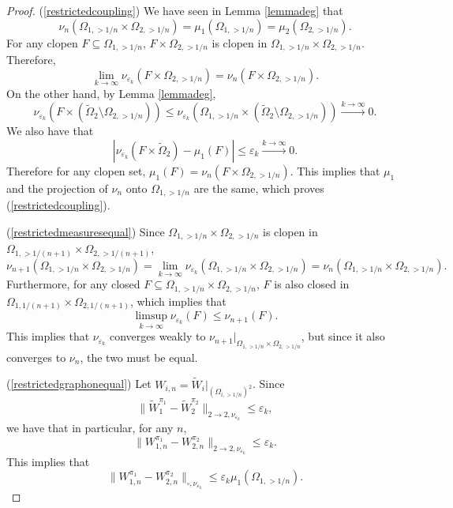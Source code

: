 \documentclass{amsart}
\numberwithin{equation}{section}
\numberwithin{figure}{section}
\theoremstyle{definition}
\theoremstyle{remark}
\begin{document}
\begin{proof}
(\ref{restrictedcoupling}) We have seen in Lemma \ref{lemmadeg} that
\[\nu_n(\Omega_{1,>1/n}\times\Omega_{2,>1/n})=\mu_1(\Omega_{1,>1/n})=\mu_2(\Omega_{2,>1/n}).\]
For any clopen $F \subseteq \Omega_{1,>1/n}$, $F \times \Omega_{2,>1/n}$ is
clopen in $\Omega_{1,>1/n}\times\Omega_{2,>1/n}$. Therefore,
\[
\lim_{k \rightarrow \infty} \nu_{\varepsilon_k}(F \times \Omega_{2,>1/n}) =
\nu_n(F \times \Omega_{2,>1/n}) .\] On the other hand, by Lemma
\ref{lemmadeg}{,}
\[\nu_{\varepsilon_k}(F \times (\widetilde\Omega_2 \setminus \Omega_{2,>1/n})) \le \nu_{\varepsilon_k}(\Omega_{1,>1/n}
\times (\widetilde\Omega_2 \setminus \Omega_{2,>1/n})) \xrightarrow{k \rightarrow \infty} 0.\] We also have that
\[|\nu_{\varepsilon_k}(F \times \widetilde\Omega_2)-\mu_1(F)| \le \varepsilon_k \xrightarrow{k \rightarrow \infty} 0 .
\]
Therefore for any clopen set, $\mu_1(F) = \nu_n(F \times \Omega_{2,>1/n})$.
This implies that $\mu_1$ and the projection of $\nu_n$ onto
$\Omega_{1,>1/n}$ are the same, which proves (\ref{restrictedcoupling}).

(\ref{restrictedmeasuresequal}) Since $\Omega_{1,>1/n} \times
\Omega_{2,>1/n}$ is clopen in $\Omega_{1,>1/(n+1)} \times
\Omega_{2,>1/(n+1)}$,
\[\nu_{n+1}(\Omega_{1,>1/n} \times \Omega_{2,>1/n})=\lim_{k \rightarrow \infty} \nu_{\varepsilon_k}(\Omega_{1,>1/n}\times \Omega_{2,>1/n})=\nu_n(\Omega_{1,>1/n}\times \Omega_{2,>1/n})
.\] Furthermore, for any closed $F \subseteq \Omega_{1,>1/n} \times
\Omega_{2,>1/n}$, $F$ is also closed in $\Omega_{1,1/(n+1)} \times
\Omega_{2,1/(n+1)}$, which implies that
\[\limsup_{k \rightarrow \infty} \nu_{\varepsilon_k}(F) \le \nu_{n+1}(F).
\] This implies that $\nu_{\varepsilon_k}$ converges
{weakly} to ${\nu_{n+1}}|_{\Omega_{1,>1/n} \times \Omega_{2,>1/n}}$, but
since it also converges to $\nu_n$, the two must be equal.

(\ref{restrictedgraphonequal}) Let $W_{i,n}={\widetilde
W_i}|_{(\Omega_{i,>1/n})^2}$. Since
\[ \|\widetilde W_1^{\pi_1}-\widetilde W_2^{\pi_2}
\|_{2 \rightarrow 2,\nu_{\varepsilon_k}} \le \varepsilon_k
,\]
we have that in particular, for any $n$,
\[\|W_{1,n}^{\pi_1}-W_{2,n}^{\pi_2}\|_{2 \rightarrow 2,\nu_{\varepsilon_k}} \le
\varepsilon_k.
\]
This implies that
\[\|W_{1,n}^{\pi_1}-W_{2,n}^{\pi_2}\|_{\square,\nu_{\varepsilon_k}} \le
\varepsilon_k \mu_1(\Omega_{1,>1/n}).
\]


\end{proof}
\end{document}
